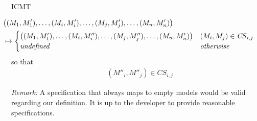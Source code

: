 \begin{copiedFrom}{ICMT}
\begin{definition}
\begin{align*}
    & \hspace{-3.1em} \big( (M_1, M'_1), \ldots, (M_i, M'_i), \ldots, (M_j, M'_j), \ldots, (M_n, M'_n) \big) \\
    & \hspace{-3.1em} \mapsto \begin{cases}
        \big( (M_1, M'_1), \ldots, (M_i, M''_i), \ldots, (M_j, M''_j), \ldots, (M_n, M'_n) \big) & (M_i, M_j) \in \mathit{CS}_{i,j} \\
        \mathit{undefined} & \mathit{otherwise}
    \end{cases}
\end{align*}
so that
\begin{align*}
    (M''_i, M''_j) \in \mathit{CS}_{i,j}
\end{align*}
\end{definition}

\noindent\textit{Remark:} %
A specification that always maps to empty models would be valid regarding our definition.
It is up to the developer to provide reasonable specifications. 





\end{copiedFrom}
